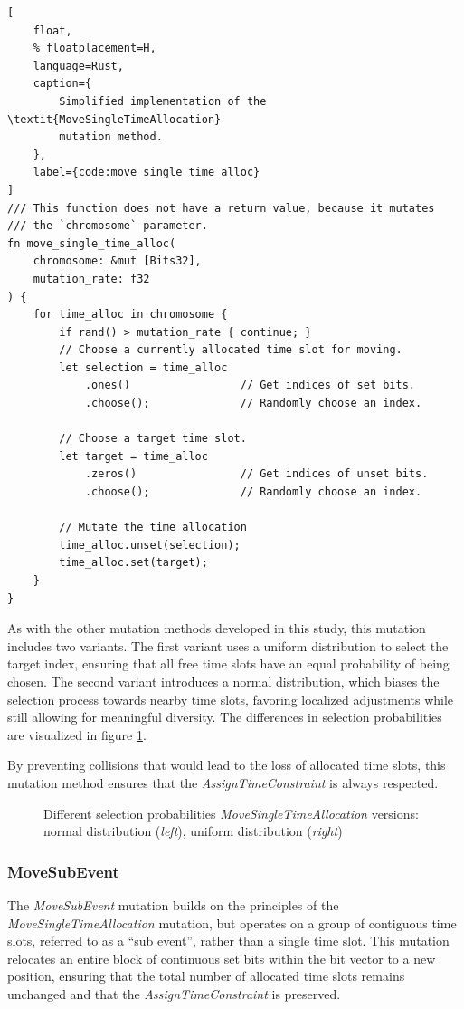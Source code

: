 \documentclass[english,examples]{isasthesis}
\begin{document}
\begin{lstlisting}[
    float,
    % floatplacement=H,
    language=Rust,
    caption={
        Simplified implementation of the \textit{MoveSingleTimeAllocation}
        mutation method.
    },
    label={code:move_single_time_alloc}
]
/// This function does not have a return value, because it mutates
/// the `chromosome` parameter.
fn move_single_time_alloc(
    chromosome: &mut [Bits32],
    mutation_rate: f32
) {
    for time_alloc in chromosome {
        if rand() > mutation_rate { continue; }
        // Choose a currently allocated time slot for moving.
        let selection = time_alloc
            .ones()                 // Get indices of set bits.
            .choose();              // Randomly choose an index.

        // Choose a target time slot.
        let target = time_alloc
            .zeros()                // Get indices of unset bits.
            .choose();              // Randomly choose an index.

        // Mutate the time allocation
        time_alloc.unset(selection);
        time_alloc.set(target);
    }
}
\end{lstlisting}

As with the other mutation methods developed in this study, this mutation
includes two variants. The first variant uses a uniform distribution to select
the target index, ensuring that all free time slots have an equal probability
of being chosen. The second variant introduces a normal distribution, which
biases the selection process towards nearby time slots, favoring localized
adjustments while still allowing for meaningful diversity. The differences
in selection probabilities are visualized in figure
\ref{fig:move_single_time_alloc}.

By preventing collisions that would lead to the loss of allocated time slots,
this mutation method ensures that the \textit{AssignTimeConstraint} is always
respected.

\begin{figure}
    \centering
    
    \caption{
        Different selection probabilities \textit{MoveSingleTimeAllocation}
        versions: normal distribution (\textit{left}), uniform distribution
        (\textit{right})
    }
    \label{fig:move_single_time_alloc}
\end{figure}

\subsubsection{MoveSubEvent}
The \textit{MoveSubEvent} mutation builds on the principles of the
\textit{MoveSingleTimeAllocation} mutation, but operates on a group of contiguous
time slots, referred to as a \enquote{sub event}, rather than a single time
slot. This mutation relocates an entire block of continuous set bits within
the bit vector to a new position, ensuring that the total number of allocated
time slots remains unchanged and that the \textit{AssignTimeConstraint} is
preserved.
\end{document}
